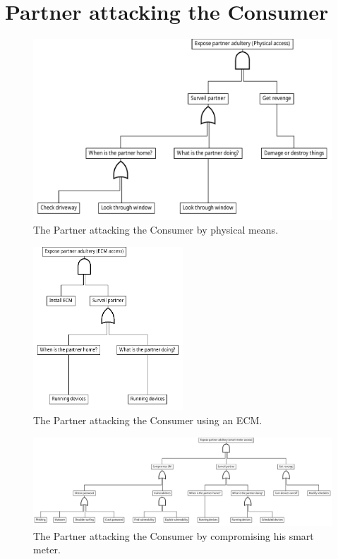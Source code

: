 
\section{Partner attacking the Consumer}
\begin{figure}[h]
  \centering
	\includegraphics[width=.75\textwidth]{figures/graphviz/partner_vs_consumer_physical.pdf}
	\caption{The Partner attacking the Consumer by physical means.}
	\label{fig:attack_trees:partner:cheater_physical}
\end{figure}

\begin{figure}[h]
  \centering
  \includegraphics[width=0.5\textwidth]{figures/graphviz/partner_vs_consumer_ecm.pdf}
  \caption{The Partner attacking the Consumer using an ECM.}
  \label{fig:attack_trees:partner:cheater_ecm}
\end{figure}

\begin{figure}[h]
  \centering
  \includegraphics[angle=90,height=\textheight]{figures/graphviz/partner_vs_consumer_sm.pdf}
  \caption{The Partner attacking the Consumer by compromising his smart meter.}
  \label{fig:attack_trees:partner:cheater_sm}
\end{figure}

